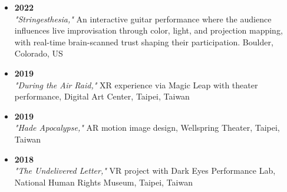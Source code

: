 \begin{itemize}

  \item \textbf{2022} \\
  \textit{"Stringesthesia,"} An interactive guitar performance where the audience influences live improvisation through color, light, and projection mapping, with real-time brain-scanned trust shaping their participation. Boulder, Colorado, US

  \item \textbf{2019} \\
  \textit{"During the Air Raid,"} XR experience via Magic Leap with theater performance, Digital Art Center, Taipei, Taiwan

  \item \textbf{2019} \\
  \textit{"Hade Apocalypse,"} AR motion image design, Wellspring Theater, Taipei, Taiwan

  \item \textbf{2018} \\
  \textit{"The Undelivered Letter,"} VR project with Dark Eyes Performance Lab, National Human Rights Museum, Taipei, Taiwan

\end{itemize}